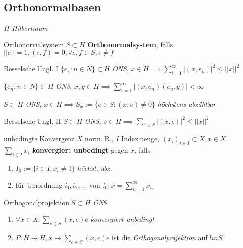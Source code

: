 \subsection{Orthonormalbasen}
$H$ \textit{Hilbertraum}

\begin{definition}{Orthonormalsystem}
  $S\subset H$ \textbf{Orthonormalsystem}, falls $||e|| = 1, (e,f) = 0,
  \forall e,f \in S, e \neq f$
\end{definition}

\begin{satz}{Besselsche Ungl. I}
  $\{e_n: n\in N\} \subset H$ \textit{ONS}, $x\in H \implies \sum_{i=1}^\infty
  |(x,e_n)|^2 \leq ||x||^2$
\end{satz}

\begin{lemma}
  $\{e_n: n\in N\} \subset H$ \textit{ONS}, $x,y \in H \implies
  \sum_{i=1}^\infty |(x,e_n)(e_n,y)| < \infty$
\end{lemma}

\begin{lemma}
  $S\subset H$ \textit{ONS}, $x\in H \implies S_x := \{e\in S: (x,e)\neq 0\}$
  \textit{höchstens abzählbar}
\end{lemma}

\begin{satz}{Besselsche Ungl. II}
  $S\subset H$ \textit{ONS},
  $x\in H \implies \sum_{e\in S} |(x,e)|^2 \leq ||x||^2$
\end{satz}

\begin{definition}{unbedingte Konvergenz}
  $X$ norm. R., $I$ Indexmenge, $(x_i)_{i\in I} \subset X, x\in X$.\\
  $\sum_{i\in I} x_i$ \textbf{konvergiert unbedingt} gegen $x$, falls
  \begin{enumerate}[label=(\roman*)]
    \item $I_0:=\{i\in I, x_i \neq 0\}$ \textit{höchst. abz.}
    \item für Umordnung ${i_1,i_2,...}$ von $I_0: x = \sum_{n=1}^\infty x_{i_n}$
  \end{enumerate}
\end{definition}

\begin{satz}{Orthogonalprojektion}
  $S\subset H$ \textit{ONS}
  \begin{enumerate}[label = (\roman*)]
    \item $\forall x\in X: \sum_{e\in S}(x,e)e$ \textit{konvergiert unbedingt}
    \item $P:H\to H, x\mapsto \sum_{e\in S}(x,e)e$ ist \uline{die}
      \textit{Orthogonalprojektion} auf $\overline{linS}$
  \end{enumerate}
\end{satz}

